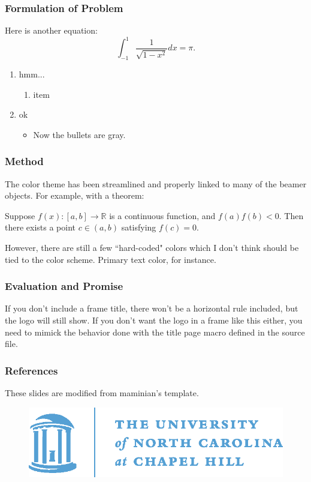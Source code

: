 \documentclass{beamer}
\begin{document}
\begin{frame}
\frametitle{Formulation of Problem}
Here is another equation:
%
\begin{equation}
\int_{-1}^1 \frac{1}{\sqrt{1-x^2}} dx = \pi.
\end{equation}

\begin{enumerate}
\item hmm...
    \begin{enumerate}
    \item item
    \end{enumerate}
\item ok
    \begin{itemize}
    \item Now the bullets are gray.
    \end{itemize}
\end{enumerate}

\end{frame}
%
\begin{frame}
\frametitle{Method}

The color theme has been streamlined and properly linked 
to many of the beamer objects. For example, with a 
theorem:

\begin{theorem}
Suppose $f(x) : [a,b] \to \mathbb{R}$ is a 
continuous function, and $f(a)f(b)<0$. Then 
there exists a point $c \in (a,b)$ satisfying 
$f(c)=0$.
\end{theorem}

However, there are still a few ``hard-coded" colors which 
I don't think should be tied to the color scheme. 
Primary text color, for instance.

\end{frame}
%
\begin{frame}
\frametitle{Evaluation and Promise}
If you don't include a frame title, there won't be a horizontal 
rule included, but the logo will still show. 
If you don't want the logo in a frame like this 
either, you need to mimick the behavior done with the 
title page macro defined in the source file.
\end{frame}
%
\begin{frame}
\frametitle{References}

These slides are modified from maminian's template\cite{UNCbeamer}.




\begin{figure}
\centering
\includegraphics[width=0.5\linewidth]{oldwell_cmyk}
\end{figure}
\end{frame}
%
\end{document}
